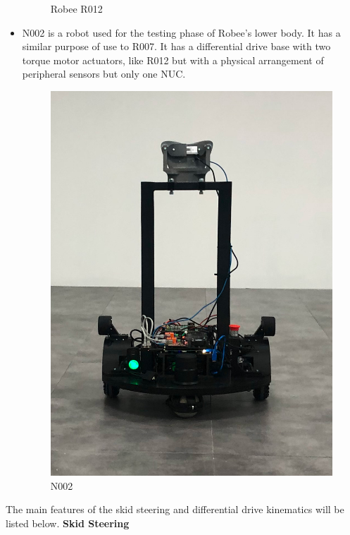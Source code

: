 \begin{itemize}
\begin{figure}[H]
        \caption{Robee R012}
        \label{fig:r012}
    \end{figure}
    \item N002 is a robot used for the testing phase of Robee's lower body. It has a similar purpose of use to R007.
    It has a differential drive base with two torque motor actuators, like R012 but with a physical arrangement of peripheral sensors but only one NUC.
    \begin{figure}[H]
        \centering
        \includegraphics[scale=0.15]{Images/Chapter 3/n002.jpg}
        \caption{N002}
        \label{fig:N002}
    \end{figure}
\end{itemize}
The main features of the skid steering and differential drive kinematics will be listed below.
\textbf{Skid Steering}

